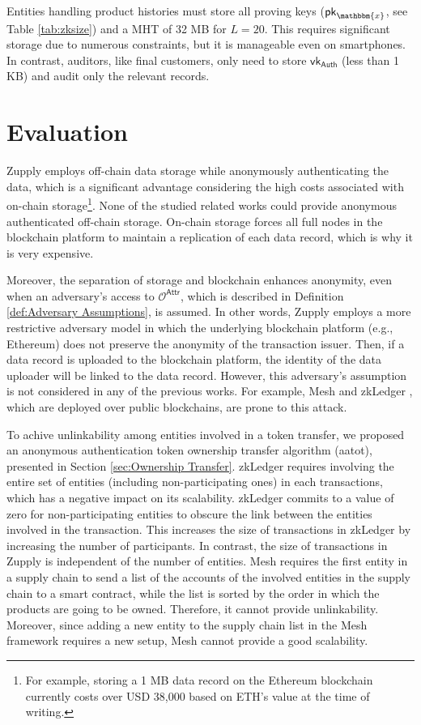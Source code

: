 Entities handling product histories must store all proving keys ($\mathsf{pk}_\mathbbm{x}$, see Table \ref{tab:zksize}) and a \textsf{MHT} of 32 MB for $L=20$. This requires significant storage due to numerous constraints, but it is manageable even on smartphones. In contrast, auditors, like final customers, only need to store $\mathsf{vk}_\mathsf{Auth}$ (less than 1 KB) and audit only the relevant records.

\section{Evaluation}
Zupply employs off-chain data storage while anonymously authenticating the data, which is a significant advantage considering the high costs associated with on-chain storage\footnote{For example, storing a 1 MB data record on the Ethereum blockchain currently costs over USD 38,000 based on ETH’s value at the time of writing.}. None of the studied related works could provide anonymous authenticated off-chain storage. On-chain storage forces all full nodes in the blockchain platform to maintain a replication of each data record, which is why it is very expensive.

Moreover, the separation of storage and blockchain enhances anonymity, even when an adversary's access to $\mathcal{O}^\mathsf{Attr}$, which is described in Definition \ref{def:Adversary Assumptions}, is assumed. In other words, Zupply employs a more restrictive adversary model in which the underlying blockchain platform (e.g., Ethereum) does not preserve the anonymity of the transaction issuer. Then, if a data record is uploaded to the blockchain platform, the identity of the data uploader will be linked to the data record. However, this adversary's assumption is not considered in any of the previous works. For example, Mesh \cite{altawy2019mesh} and zkLedger \cite{zkLedger2018}, which are deployed over public blockchains, are prone to this attack.


To achive unlinkability among entities involved in a token transfer, we proposed an anonymous authentication token ownership transfer algorithm (\gls{aatot}), presented in Section \ref{sec:Ownership Transfer}. zkLedger requires involving the entire set of entities (including non-participating ones) in each transactions, which has a negative impact on its scalability. zkLedger commits to a value of zero for non-participating entities to obscure the link between the entities involved in the transaction. This increases the size of transactions in zkLedger by increasing the number of participants.  In contrast, the size of transactions in Zupply is independent of the number of entities. Mesh requires the first entity in a supply chain to send a list of the accounts of the involved entities in the supply chain to a smart contract, while the list is sorted by the order in which the products are going to be owned. Therefore, it cannot  provide unlinkability. Moreover, since adding a new entity to the supply chain list in the Mesh framework requires a new setup, Mesh cannot provide a good scalability.

